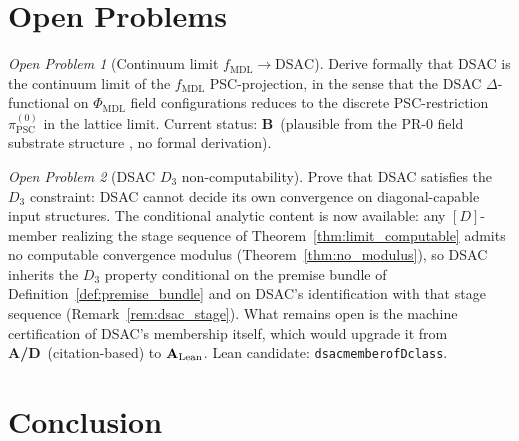 \documentclass[11pt]{article}
\theoremstyle{remark}
\newtheorem{openprob}{Open Problem}
\newcommand{\PSC}{\text{PSC}}
\newcommand{\PHIMDL}{\ensuremath{\Phi_{\mathrm{MDL}}}}
\newcommand{\lean}[1]{%
  \penalty-100
  \begingroup\def\_{\textunderscore\allowbreak}\texttt{#1}\endgroup}
\newcommand{\fmdl}{\ensuremath{f_{\mathrm{MDL}}}}
\newcommand{\DSAC}{\text{DSAC}}
\newcommand{\CatAL}{\ensuremath{\textbf{A}_{\rm Lean}}}
\newcommand{\CatAD}{\textbf{A/D}}
\newcommand{\CatB}{\textbf{B}}
\begin{document}
\section{Open Problems}
\label{sec:open}

\begin{openprob}[Continuum limit $\fmdl{} \to \DSAC$]
\label{op:dsac_continuum}
Derive formally that DSAC is the continuum limit of the $\fmdl{}$
PSC-projection, in the sense that the DSAC $\Delta$-functional on
$\PHIMDL$ field configurations reduces to the discrete PSC-restriction
$\pi_{\PSC}^{(0)}$ in the lattice limit.
Current status: \CatB\ (plausible from the PR-0 field substrate structure
\cite{SpivackMFRR}, no formal derivation).
\end{openprob}

\begin{openprob}[DSAC $D_3$ non-computability]
\label{op:dsac_noncomp}
Prove that DSAC satisfies the $D_3$ constraint: DSAC cannot decide its
own convergence on diagonal-capable input structures. The conditional
analytic content is now available: any $[D]$-member realizing the stage
sequence of Theorem~\ref{thm:limit_computable} admits no computable
convergence modulus (Theorem~\ref{thm:no_modulus}), so DSAC inherits the
$D_3$ property conditional on the premise bundle of
Definition~\ref{def:premise_bundle} and on DSAC's identification with
that stage sequence (Remark~\ref{rem:dsac_stage}).
What remains open is the machine certification of DSAC's membership
itself, which would upgrade it from \CatAD\ (citation-based) to \CatAL.
Lean candidate: \lean{dsac\_member\_of\_D\_class}.
\end{openprob}

\section{Conclusion}
\label{sec:conclusion}
\end{document}
